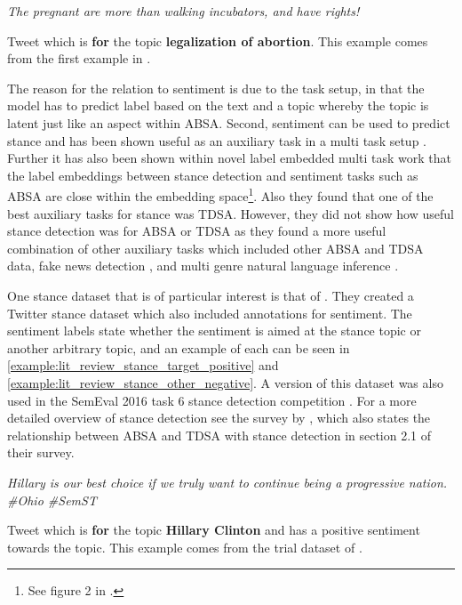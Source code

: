 \begin{example}
\textit{The pregnant are more than walking incubators, and have rights!}
\caption{Tweet which is \textbf{for} the topic \textbf{legalization of abortion}. This example comes from the first example in \citet{mohammad-etal-2016-semeval}.}
\label{example:lit_review_stance}
\end{example}

The reason for the relation to sentiment is due to the task setup, in that the model has to predict label based on the text and a topic whereby the topic is latent just like an aspect within ABSA. Second, sentiment can be used to predict stance \citep{somasundaran-wiebe-2009-recognizing, somasundaran-wiebe-2010-recognizing, mohammad2017stance} and has been shown useful as an auxiliary task in a multi task setup \citep{li-caragea-2019-multi}. Further it has also been shown within \citet{augenstein-etal-2018-multi} novel label embedded multi task work that the label embeddings between stance detection and sentiment tasks such as ABSA are close within the embedding space\footnote{See figure 2 in \citet{augenstein-etal-2018-multi}.}. Also they found that one of the best auxiliary tasks for stance was TDSA. However, they did not show how useful stance detection was for ABSA or TDSA as they found a more useful combination of other auxiliary tasks which included other ABSA and TDSA data, fake news detection \citep{riedel2017simple}, and multi genre natural language inference \citep{nangia-etal-2017-repeval}.

One stance dataset that is of particular interest is that of \citet{mohammad2017stance}. They created a Twitter stance dataset which also included annotations for sentiment. The sentiment labels state whether the sentiment is aimed at the stance topic or another arbitrary topic, and an example of each can be seen in \ref{example:lit_review_stance_target_positive} and \ref{example:lit_review_stance_other_negative}. A version of this dataset was also used in the SemEval 2016 task 6 stance detection competition \citet{mohammad-etal-2016-semeval}. For a more detailed overview of stance detection see the survey by \citet{kuccuk2020stance}, which also states the relationship between ABSA and TDSA with stance detection in section 2.1 of their survey.

\begin{example}
\textit{Hillary is our best choice if we truly want to continue being a progressive nation. \#Ohio \#SemST}
\caption{Tweet which is \textbf{for} the topic \textbf{Hillary Clinton} and has a positive sentiment towards the topic. This example comes from the trial dataset of \citet{mohammad2017stance}.}
\label{example:lit_review_stance_target_positive}
\end{example}

